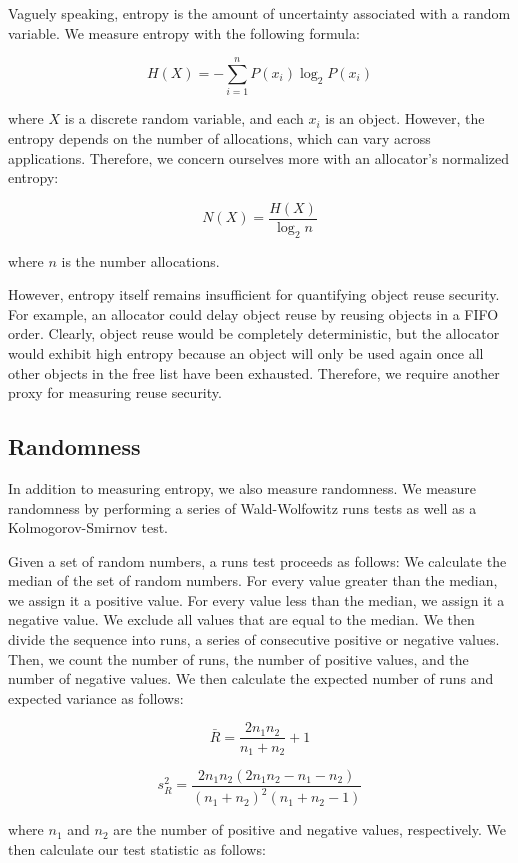\documentclass[11pt]{article}
\begin{document}
\begin{multicols*}{2}
\noindent Vaguely speaking, entropy is the amount of uncertainty associated with a random variable.
We measure entropy with the following formula:

\[ H(X) = -\sum_{i=1}^{n} P(x_i)\log_2P(x_i) \]

\noindent where \( X \) is a discrete random variable, and each \( x_i \) is an object.
However, the entropy depends on the number of allocations, which can vary across applications.
Therefore, we concern ourselves more with an allocator's normalized entropy:

\[ N(X) = \frac{H(X)}{\log_2n} \]

\noindent where \( n \) is the number allocations.

However, entropy itself remains insufficient for quantifying object reuse security.
For example, an allocator could delay object reuse by reusing objects in a FIFO order.
Clearly, object reuse would be completely deterministic, but the allocator would exhibit high entropy because an object will only be used again once all other objects in the free list have been exhausted.
Therefore, we require another proxy for measuring reuse security.

\subsection{Randomness}

\noindent In addition to measuring entropy, we also measure randomness.
We measure randomness by performing a series of Wald-Wolfowitz runs tests as well as a Kolmogorov-Smirnov test.

Given a set of random numbers, a runs test proceeds as follows:
We calculate the median of the set of random numbers.
For every value greater than the median, we assign it a positive value.
For every value less than the median, we assign it a negative value. 
We exclude all values that are equal to the median.
We then divide the sequence into runs, a series of consecutive positive or negative values.
Then, we count the number of runs, the number of positive values, and the number of negative values.
We then calculate the expected number of runs and expected variance as follows:

\[ \bar{R} = \frac{2n_1n_2}{n_1 + n_2} + 1 \]

\[ s^2_R = \frac{2n_1n_2(2n_1n_2-n_1-n_2)}{(n_1 + n_2)^2(n_1 + n_2 - 1)}\]

\noindent where \( n_1 \) and \( n_2 \) are the number of positive and negative values, respectively.
We then calculate our test statistic as follows:


\end{multicols*}
\end{document}
